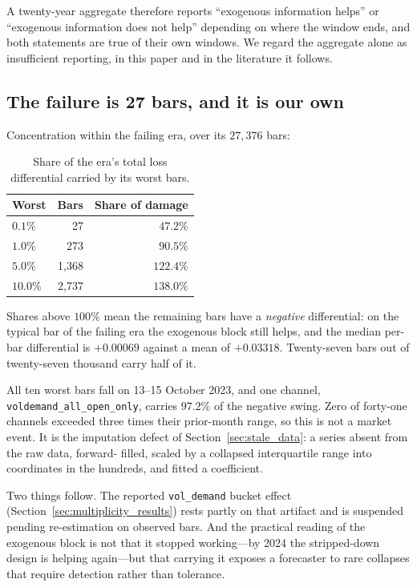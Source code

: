 A twenty-year aggregate therefore reports ``exogenous information helps'' or
``exogenous information does not help'' depending on where the window ends,
and both statements are true of their own windows. We regard the aggregate
alone as insufficient reporting, in this paper and in the literature it
follows.

\subsection{The failure is 27 bars, and it is our own}

Concentration within the failing era, over its $27{,}376$ bars:

\begin{table}[H]
\centering
\caption{Share of the era's total loss differential carried by its worst bars.}
\label{tab:concentration}
\begin{tabular}{lrr}
\toprule
Worst & Bars & Share of damage \\
\midrule
$0.1\%$ &    27 & $47.2\%$ \\
$1.0\%$ &   273 & $90.5\%$ \\
$5.0\%$ & 1{,}368 & $122.4\%$ \\
$10.0\%$ & 2{,}737 & $138.0\%$ \\
\bottomrule
\end{tabular}
\end{table}

Shares above $100\%$ mean the remaining bars have a \emph{negative}
differential: on the typical bar of the failing era the exogenous block still
helps, and the median per-bar differential is $+0.00069$ against a mean of
$+0.03318$. Twenty-seven bars out of twenty-seven thousand carry half of it.

All ten worst bars fall on 13--15 October 2023, and one channel,
\texttt{voldemand\_all\_open\_only}, carries $97.2\%$ of the negative swing.
Zero of forty-one channels exceeded three times their prior-month range, so
this is not a market event. It is the imputation defect of
Section~\ref{sec:stale_data}: a series absent from the raw data, forward-
filled, scaled by a collapsed interquartile range into coordinates in the
hundreds, and fitted a coefficient.

Two things follow. The reported \texttt{vol\_demand} bucket effect
(Section~\ref{sec:multiplicity_results}) rests partly on that artifact and is
suspended pending re-estimation on observed bars. And the practical reading of
the exogenous block is not that it stopped working---by 2024 the stripped-down
design is helping again---but that carrying it exposes a forecaster to rare
collapses that require detection rather than tolerance.
